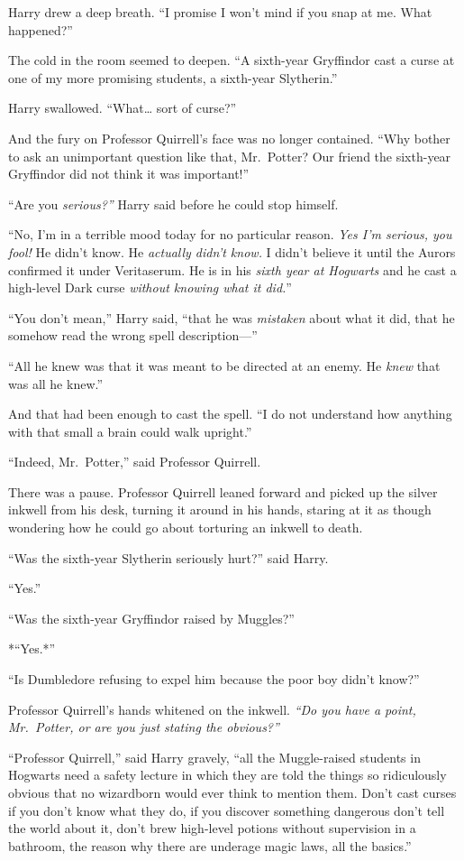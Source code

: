 Harry drew a deep breath. ``I promise I won't mind if you snap at me.
What happened?''

The cold in the room seemed to deepen. ``A sixth-year Gryffindor cast a
curse at one of my more promising students, a sixth-year Slytherin.''

Harry swallowed. ``What\ldots{} sort of curse?''

And the fury on Professor Quirrell's face was no longer contained. ``Why
bother to ask an unimportant question like that, Mr.~Potter? Our friend
the sixth-year Gryffindor did not think it was important!''

``Are you \emph{serious?''} Harry said before he could stop himself.

``No, I'm in a terrible mood today for no particular reason. \emph{Yes
I'm serious, you fool!} He didn't know. He \emph{actually didn't know.}
I didn't believe it until the Aurors confirmed it under Veritaserum. He
is in his \emph{sixth year at Hogwarts} and he cast a high-level Dark
curse \emph{without knowing what it did.}''

``You don't mean,'' Harry said, ``that he was \emph{mistaken} about what
it did, that he somehow read the wrong spell description---''

``All he knew was that it was meant to be directed at an enemy. He
\emph{knew} that was all he knew.''

And that had been enough to cast the spell. ``I do not understand how
anything with that small a brain could walk upright.''

``Indeed, Mr.~Potter,'' said Professor Quirrell.

There was a pause. Professor Quirrell leaned forward and picked up the
silver inkwell from his desk, turning it around in his hands, staring at
it as though wondering how he could go about torturing an inkwell to
death.

``Was the sixth-year Slytherin seriously hurt?'' said Harry.

``Yes.''

``Was the sixth-year Gryffindor raised by Muggles?''

*``Yes.*''

``Is Dumbledore refusing to expel him because the poor boy didn't
know?''

Professor Quirrell's hands whitened on the inkwell. \emph{``Do you have
a point, Mr.~Potter, or are you just stating the obvious?''}

``Professor Quirrell,'' said Harry gravely, ``all the Muggle-raised
students in Hogwarts need a safety lecture in which they are told the
things so ridiculously obvious that no wizardborn would ever think to
mention them. Don't cast curses if you don't know what they do, if you
discover something dangerous don't tell the world about it, don't brew
high-level potions without supervision in a bathroom, the reason why
there are underage magic laws, all the basics.''

